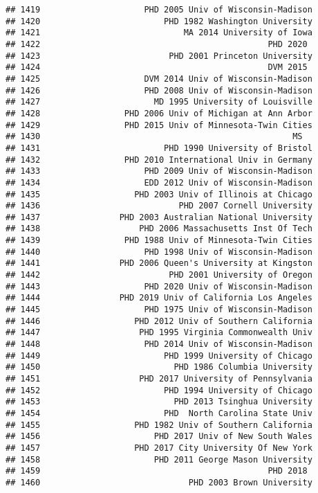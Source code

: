 \documentclass[
]{article}
\begin{document}
\begin{verbatim}
## 1419                     PHD 2005 Univ of Wisconsin-Madison
## 1420                         PHD 1982 Washington University
## 1421                             MA 2014 University of Iowa
## 1422                                              PHD 2020 
## 1423                          PHD 2001 Princeton University
## 1424                                              DVM 2015 
## 1425                     DVM 2014 Univ of Wisconsin-Madison
## 1426                     PHD 2008 Univ of Wisconsin-Madison
## 1427                       MD 1995 University of Louisville
## 1428                 PHD 2006 Univ of Michigan at Ann Arbor
## 1429                 PHD 2015 Univ of Minnesota-Twin Cities
## 1430                                                   MS  
## 1431                         PHD 1990 University of Bristol
## 1432                 PHD 2010 International Univ in Germany
## 1433                     PHD 2009 Univ of Wisconsin-Madison
## 1434                     EDD 2012 Univ of Wisconsin-Madison
## 1435                   PHD 2003 Univ of Illinois at Chicago
## 1436                            PHD 2007 Cornell University
## 1437                PHD 2003 Australian National University
## 1438                    PHD 2006 Massachusetts Inst Of Tech
## 1439                 PHD 1988 Univ of Minnesota-Twin Cities
## 1440                     PHD 1998 Univ of Wisconsin-Madison
## 1441                PHD 2006 Queen's University at Kingston
## 1442                          PHD 2001 University of Oregon
## 1443                     PHD 2020 Univ of Wisconsin-Madison
## 1444                PHD 2019 Univ of California Los Angeles
## 1445                     PHD 1975 Univ of Wisconsin-Madison
## 1446                   PHD 2012 Univ of Southern California
## 1447                    PHD 1995 Virginia Commonwealth Univ
## 1448                     PHD 2014 Univ of Wisconsin-Madison
## 1449                         PHD 1999 University of Chicago
## 1450                           PHD 1986 Columbia University
## 1451                    PHD 2017 University of Pennsylvania
## 1452                         PHD 1994 University of Chicago
## 1453                           PHD 2013 Tsinghua University
## 1454                         PHD  North Carolina State Univ
## 1455                   PHD 1982 Univ of Southern California
## 1456                       PHD 2017 Univ of New South Wales
## 1457                   PHD 2017 City University Of New York
## 1458                       PHD 2011 George Mason University
## 1459                                              PHD 2018 
## 1460                              PHD 2003 Brown University

\end{verbatim}
\end{document}
